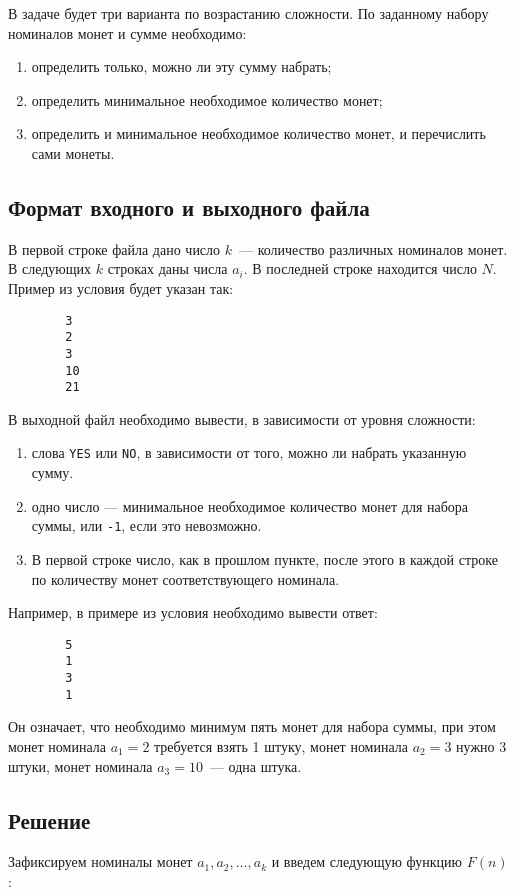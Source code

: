 \documentclass{article}
\begin{document}
    В задаче будет три варианта по возрастанию сложности. По заданному набору номиналов монет и сумме необходимо:
    \begin{enumerate}
        \item определить только, можно ли эту сумму набрать;
        \item определить минимальное необходимое количество монет;
        \item определить и минимальное необходимое количество монет, и перечислить сами монеты.
    \end{enumerate}
    \subsection{Формат входного и выходного файла}
    В первой строке файла дано число $k$~--- количество различных номиналов монет.
    В следующих $k$ строках даны числа $a_i$. В последней строке находится число $N$.
    Пример из условия будет указан так:
    \begin{verbatim}
        3
        2
        3
        10
        21
    \end{verbatim}
    В выходной файл необходимо вывести, в зависимости от уровня сложности:
    \begin{enumerate}
        \item слова \verb|YES| или \verb|NO|, в зависимости от того, можно ли набрать указанную сумму.
        \item одно число — минимальное необходимое количество монет для набора суммы, или \verb|-1|, если это невозможно.
        \item В первой строке число, как в прошлом пункте, после этого в каждой строке по количеству монет соответствующего номинала.
    \end{enumerate}

    Например, в примере из условия необходимо вывести ответ:
    \begin{verbatim}
        5
        1
        3
        1
    \end{verbatim}
    Он означает, что необходимо минимум пять монет для набора суммы, при этом монет номинала $a_1=2$ требуется взять 1 штуку, монет номинала $a_2=3$ нужно 3 штуки, монет номинала $a_3=10$~--- одна штука.

    \subsection{Решение}
    Зафиксируем номиналы монет $a_1, a_2, \ldots, a_k$ и введем следующую функцию $F(n)$:
\end{document}
